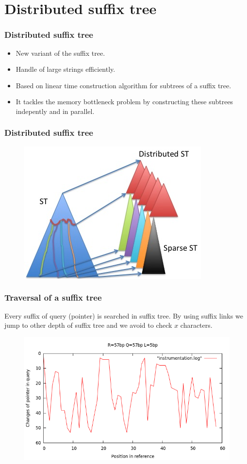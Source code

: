 \documentclass{beamer}
\begin{document}
\section{Distributed suffix tree}
\begin{frame}
\frametitle{Distributed suffix tree}
\begin{block}{}
  \begin{itemize}
    \item New variant of the suffix tree.
    \item Handle of large strings efficiently.
    \item Based on linear time construction algorithm for subtrees of a suffix tree.
    \item It tackles the memory bottleneck problem by constructing these subtrees indepently and in parallel.
  \end{itemize}
\end{block}
\end{frame}
\begin{frame}
  \frametitle{Distributed suffix tree}
  \begin{figure}
    \includegraphics[scale=0.8]{distributed.png}
  \end{figure}
\end{frame}
\begin{frame}
  \frametitle{Traversal of a suffix tree}
  \begin{block}{}
   Every suffix of query (pointer) is searched in suffix tree. By using suffix links 
   we jump to other depth of suffix tree and we avoid to check $x$ characters.
 \end{block}
  \begin{figure}\includegraphics[scale=0.4]{r57-q57-l5.png}\end{figure}
\end{frame}
\end{document}
